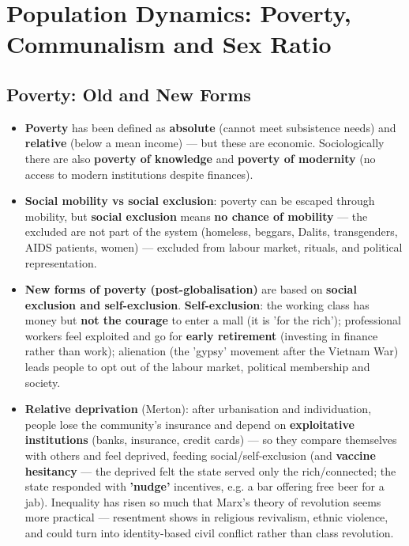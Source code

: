 \chapter{Population Dynamics: Poverty, Communalism and Sex Ratio}

\section{Poverty: Old and New Forms}

\begin{KeyConcept}
\begin{itemize}
\item \textbf{Poverty} has been defined as \textbf{absolute} (cannot meet subsistence needs) and \textbf{relative} (below a mean income) --- but these are economic. Sociologically there are also \textbf{poverty of knowledge} and \textbf{poverty of modernity} (no access to modern institutions despite finances).
\item \textbf{Social mobility vs social exclusion}: poverty can be escaped through mobility, but \textbf{social exclusion} means \textbf{no chance of mobility} --- the excluded are not part of the system (homeless, beggars, Dalits, transgenders, AIDS patients, women) --- excluded from labour market, rituals, and political representation.
\item \textbf{New forms of poverty (post-globalisation)} are based on \textbf{social exclusion and self-exclusion}. \textbf{Self-exclusion}: the working class has money but \textbf{not the courage} to enter a mall (it is 'for the rich'); professional workers feel exploited and go for \textbf{early retirement} (investing in finance rather than work); alienation (the 'gypsy' movement after the Vietnam War) leads people to opt out of the labour market, political membership and society.
\item \textbf{Relative deprivation} (Merton): after urbanisation and individuation, people lose the community's insurance and depend on \textbf{exploitative institutions} (banks, insurance, credit cards) --- so they compare themselves with others and feel deprived, feeding social/self-exclusion (and \textbf{vaccine hesitancy} --- the deprived felt the state served only the rich/connected; the state responded with \textbf{'nudge'} incentives, e.g. a bar offering free beer for a jab). Inequality has risen so much that Marx's theory of revolution seems more practical --- resentment shows in religious revivalism, ethnic violence, and could turn into identity-based civil conflict rather than class revolution.
\end{itemize}
\end{KeyConcept}


